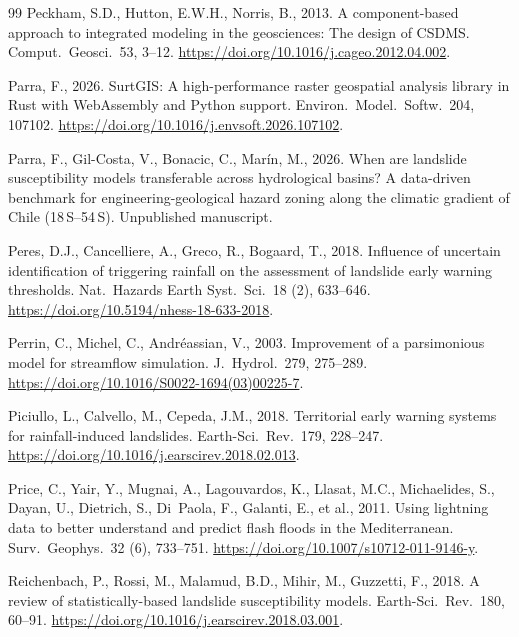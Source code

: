\documentclass[authoryear,preprint,review,12pt]{elsarticle}
\begin{document}
\begin{thebibliography}{99}
Peckham, S.D., Hutton, E.W.H., Norris, B., 2013. A component-based approach to
integrated modeling in the geosciences: The design of CSDMS. Comput.\ Geosci.\
53, 3--12. \url{https://doi.org/10.1016/j.cageo.2012.04.002}.

Parra, F., 2026. SurtGIS: A high-performance raster geospatial analysis library
in Rust with WebAssembly and Python support. Environ.\ Model.\ Softw.\ 204,
107102. \url{https://doi.org/10.1016/j.envsoft.2026.107102}.

Parra, F., Gil-Costa, V., Bonacic, C., Mar\'in, M., 2026. When are landslide
susceptibility models transferable across hydrological basins? A data-driven
benchmark for engineering-geological hazard zoning along the climatic gradient of
Chile (18\textdegree\,S--54\textdegree\,S). Unpublished manuscript.

Peres, D.J., Cancelliere, A., Greco, R., Bogaard, T., 2018. Influence of
uncertain identification of triggering rainfall on the assessment of landslide
early warning thresholds. Nat.\ Hazards Earth Syst.\ Sci.\ 18 (2), 633--646.
\url{https://doi.org/10.5194/nhess-18-633-2018}.

Perrin, C., Michel, C., Andr\'eassian, V., 2003. Improvement of a parsimonious
model for streamflow simulation. J.\ Hydrol.\ 279, 275--289.
\url{https://doi.org/10.1016/S0022-1694(03)00225-7}.

Piciullo, L., Calvello, M., Cepeda, J.M., 2018. Territorial early warning systems
for rainfall-induced landslides. Earth-Sci.\ Rev.\ 179, 228--247.
\url{https://doi.org/10.1016/j.earscirev.2018.02.013}.

Price, C., Yair, Y., Mugnai, A., Lagouvardos, K., Llasat, M.C., Michaelides, S.,
Dayan, U., Dietrich, S., Di~Paola, F., Galanti, E., et al., 2011. Using lightning
data to better understand and predict flash floods in the Mediterranean. Surv.\
Geophys.\ 32 (6), 733--751. \url{https://doi.org/10.1007/s10712-011-9146-y}.

\bibitem[Reichenbach et al.(2018)]{reichenbach2018}
Reichenbach, P., Rossi, M., Malamud, B.D., Mihir, M., Guzzetti, F., 2018. A review
of statistically-based landslide susceptibility models. Earth-Sci.\ Rev.\ 180,
60--91. \url{https://doi.org/10.1016/j.earscirev.2018.03.001}.


\end{thebibliography}
\end{document}
